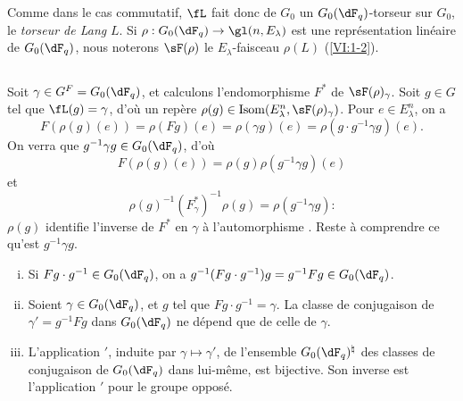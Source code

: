 Comme dans le cas commutatif, $\fL$ fait donc de $G_0$ un $G_0(\dF_q)$-torseur 
sur $G_0$, le \emph{torseur de Lang} $L$. Si 
$\rho:G_0(\dF_q) \to \gl(n,E_\lambda)$ est une représentation linéaire de 
$G_0(\dF_q)$, nous noterons $\sF(\rho)$ le $E_\lambda$-faisceau $\rho(L)$ 
(\ref{VI:1-2}). 





\subsection{}\label{VI:1-23}

Soit $\gamma\in G^F=G_0(\dF_q)$, et calculons l'endomorphisme $F^\ast$ de 
$\sF(\rho)_\gamma$. Soit $g\in G$ tel que $\fL(g)=\gamma$, d'où un repère 
$\rho(g)\in \operatorname{Isom}(E_\lambda^n,\sF(\rho)_\gamma)$. Pour 
$e\in E_\lambda^n$, on a 
\[
  F(\rho(g)(e)) = \rho(F g)(e) = \rho(\gamma g)(e) = \rho(g\cdot g^{-1}\gamma g)(e) \text{.}
\]
On verra que $g^{-1} \gamma g\in G_0(\dF_q)$, d'où 
\[
  F(\rho(g)(e)) = \rho(g) \rho(g^{-1}\gamma g)(e)
\]
et 
\begin{equation*}\tag{1.23.1}\label{VI:eq:1-23-1}
  \rho(g)^{-1} (F_\gamma^\ast)^{-1} \rho(g) = \rho(g^{-1} \gamma g) \text{:}
\end{equation*}
$\rho(g)$ identifie l'inverse de $F^\ast$ en $\gamma$ à l'automorphisme 
. Reste à comprendre ce qu'est 
$g^{-1} \gamma g$. 





\begin{lemma_}\label{VI:1-24}
\begin{enumerate}[(i)]
  \item Si $F g\cdot g^{-1} \in G_0(\dF_q)$, on a 
    $g^{-1} (F g\cdot g^{-1}) g = g^{-1} F g\in G_0(\dF_q)$.
  \item Soient $\gamma\in G_0(\dF_q)$, et $g$ tel que 
    $F g\cdot g^{-1} = \gamma$. La classe de conjugaison de $\gamma'=g^{-1} Fg$ 
    dans $G_0(\dF_q)$ ne dépend que de celle de $\gamma$. 
  \item L'application $\prime$, induite par $\gamma\mapsto \gamma'$, de l'ensemble 
    $G_0(\dF_q)^\natural$ des classes de conjugaison de $G_0(\dF_q)$ dans 
    lui-même, est bijective. Son inverse est l'application $\prime$ pour le groupe 
    opposé. 
\end{enumerate}
\end{lemma_}

